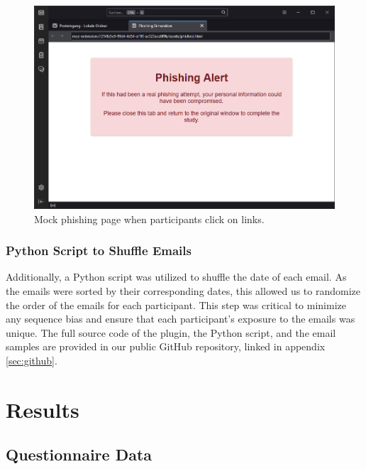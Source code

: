 \documentclass[
  a4paper,  %
  twoside,  %
  bibliography=totoc,
  headsepline,
  cleardoublepage=empty,
  parskip=half,
  draft=false
]{scrbook}
\begin{document}
\begin{figure} [ht]
    \centering
    \includegraphics[width=1\linewidth]{figures/mockpage.png}
    \caption{Mock phishing page when participants click on links.}
    \label{fig:mock}
\end{figure}


\subsection{Python Script to Shuffle Emails}
Additionally, a Python script was utilized to shuffle the date of each email. As the emails were sorted by their corresponding dates, this allowed us to randomize the order of the emails for each participant. This step was critical to minimize any sequence bias and ensure that each participant's exposure to the emails was unique. The full source code of the plugin, the Python script, and the email samples are provided in our public GitHub repository, linked in appendix \ref{sec:github}.

\chapter{Results}
\label{results}

\section{Questionnaire Data}
\end{document}
